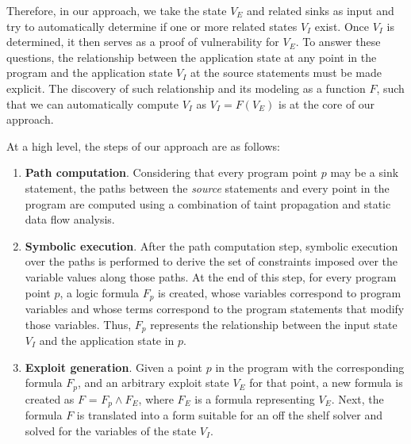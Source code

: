 {\color{orange} Therefore, in our approach, we take the state $V_E$ and related sinks as input and try to automatically determine if one or more related states $V_I$ exist.} Once $V_I$ is determined, it then serves as a proof of vulnerability for $V_E$. To answer these questions, the relationship between the application state at any point in the program and the application state $V_I$ at the source statements must be made explicit. The discovery of such relationship and its modeling as a function $F$, such that we can automatically compute $V_I$ as $V_I = F(V_E)$ is at the core of our approach. 

At a high level, the steps of our approach are as follows:
\begin{enumerate}
	\item \textbf{Path computation}. Considering that every program point $p$ may be a sink statement, the paths between the \textit{source} statements and every point in the program are computed using a combination of taint propagation and static data flow analysis. 
	\item \textbf{Symbolic execution}. After the path computation step, symbolic execution over the paths is performed to derive the set of constraints imposed over the variable values along those paths. At the end of this step, for every program point $p$, a logic formula $F_p$ is created, whose variables correspond to program variables and whose terms correspond to the program statements that modify those variables. Thus, $F_p$ represents the relationship between the input state $V_I$ and the application state in $p$.
	\item \textbf{Exploit generation}. Given a point $p$ in the program with the corresponding formula $F_p$, and an arbitrary exploit state $V_E$ for that point, a new formula is created as $F$ = $F_p \wedge F_E$, where $F_E$ is a formula representing $V_E$. Next, the formula $F$ is translated into a form suitable for an off the shelf solver and solved for the variables of the state $V_I$. 
\end{enumerate}

